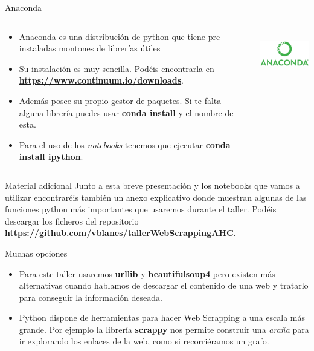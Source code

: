 \documentclass{beamer}
\begin{document}
	\begin{frame}{Anaconda}
		\begin{columns}[T]
			\begin{column}[T]{8cm} 
				\begin{itemize}  
					\item Anaconda es una distribución de python que tiene pre-instaladas montones de librerías útiles 
					\item Su instalación es muy sencilla. Podéis encontrarla en \textbf{\url{https://www.continuum.io/downloads}}.
					\item Además posee su propio gestor de paquetes. Si te falta alguna librería puedes usar \textbf{conda install} 
					y el nombre de esta.
					\item Para el uso de los \textit{notebooks} tenemos que ejecutar \textbf{conda install ipython}.
				\end{itemize}
			\end{column}
			
			\begin{column}[T]{5cm}
				\includegraphics[height=2cm]{anaconda.png}
			\end{column}
		\end{columns}
	\end{frame}
	\begin{frame}{Material adicional}
		Junto a esta breve presentación y los notebooks que vamos a utilizar encontraréis también un anexo explicativo
		donde muestran algunas de las funciones python más importantes que usaremos durante el taller. Podéis descargar
		los ficheros del repositorio \textbf{\url{https://github.com/vblanes/tallerWebScrappingAHC}}.
	\end{frame}
	\begin{frame}{Muchas opciones}
		\begin{itemize}
			\item Para este taller usaremos \textbf{urllib} y \textbf{beautifulsoup4} pero existen 
			más alternativas cuando hablamos de descargar el contenido de una web y tratarlo para conseguir 
			la información deseada.
			\item Python dispone de herramientas para hacer Web Scrapping a una escala más grande. Por ejemplo la librería 
			\textbf{scrappy} nos permite construir una \textit{araña} para ir explorando los enlaces de la web, como si recorriéramos un grafo.
		\end{itemize}
	\end{frame}
\end{document}
